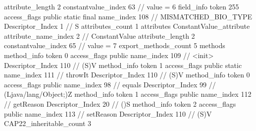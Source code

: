 {{{{{{{					attribute_length	2
					constantvalue_index	63		// value = 6
				}
				}
			}
			field_info {
				token	255
				access_flags	public static final
				name_index	108		// MISMATCHED_BIO_TYPE
				Descriptor_Index	1		// S
				attributes_count	1
				attributes {
				ConstantValue_attribute {
					attribute_name_index	2		// ConstantValue
					attribute_length	2
					constantvalue_index	65		// value = 7
				}
				}
			}
			}
			export_methods_count	5
			methods {
				method_info {
					token	0
					access_flags	public
					name_index	109		// <init>
					Descriptor_Index	110		// (S)V
				}
				method_info {
					token	1
					access_flags	public static
					name_index	111		// throwIt
					Descriptor_Index	110		// (S)V
				}
				method_info {
					token	0
					access_flags	public
					name_index	98		// equals
					Descriptor_Index	99		// (Ljava/lang/Object;)Z
				}
				method_info {
					token	1
					access_flags	public
					name_index	112		// getReason
					Descriptor_Index	20		// ()S
				}
				method_info {
					token	2
					access_flags	public
					name_index	113		// setReason
					Descriptor_Index	110		// (S)V
				}
			}
			CAP22_inheritable_count	3
		}
	}
}
